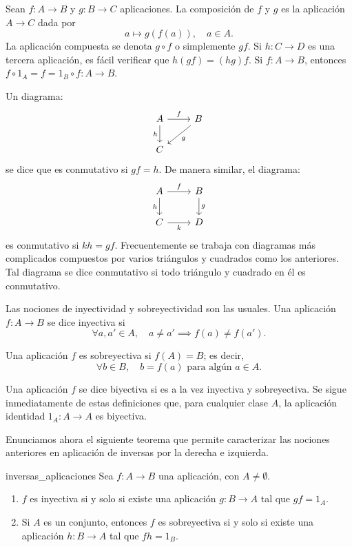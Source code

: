 Sean \( f: A \to B \) y \( g: B \to C \) aplicaciones. La {composición} de \( f \) y \( g \) es la aplicación \( A \to C \) dada por
\[
a \mapsto g(f(a)), \quad a \in A.
\]
La aplicación compuesta se denota \( g \circ f \) o simplemente \( gf \). Si \( h: C \to D \) es una tercera aplicación, es fácil verificar que \( h(gf) = (hg)f \). Si \( f: A \to B \), entonces \( f \circ 1_A = f = 1_B \circ f: A \to B \).

Un diagrama:
\[
\begin{tikzcd}
    A \arrow{r}{f} \arrow[swap]{d}{h} & B \arrow{dl}{g} \\
    C
\end{tikzcd}
\]
se dice que es conmutativo si \( gf = h \). De manera similar, el diagrama:
\[
\begin{tikzcd}
    A \arrow{r}{f} \arrow[swap]{d}{h} & B \arrow{d}{g} \\
    C \arrow[swap]{r}{k} & D 
  \end{tikzcd}
\]
es conmutativo si \( kh = gf \). Frecuentemente se trabaja con diagramas más complicados compuestos por varios triángulos y cuadrados como los anteriores. Tal diagrama se dice conmutativo si todo triángulo y cuadrado en él es conmutativo.

Las nociones de inyectividad y sobreyectividad son las usuales. Una aplicación \( f: A \to B \) se dice inyectiva si
\[
\forall a, a' \in A, \quad a \neq a' \implies f(a) \neq f(a').
\]

Una aplicación \( f \) es sobreyectiva si \( f(A) = B \); es decir,
\[
\forall b \in B, \quad b = f(a) \text{ para algún } a \in A.
\]

Una aplicación \( f \) se dice biyectiva si es a la vez inyectiva y sobreyectiva. Se sigue inmediatamente de estas definiciones que, para cualquier clase \( A \), la aplicación identidad \( 1_A: A \to A \) es biyectiva.

Enunciamos ahora el siguiente teorema que permite caracterizar las nociones anteriores en aplicación de inversas por la derecha e izquierda.

\begin{theorem}{}{inversas_aplicaciones}
    Sea \( f: A \to B \) una aplicación, con \( A \neq \emptyset \).
    \begin{enumerate}
        \item \( f \) es inyectiva si y solo si existe una aplicación \( g: B \to A \) tal que \( gf = 1_A \).

        \item Si \( A \) es un conjunto, entonces \( f \) es sobreyectiva si y solo si existe una aplicación \( h: B \to A \) tal que \( fh = 1_B \).
    \end{enumerate}
\end{theorem}

